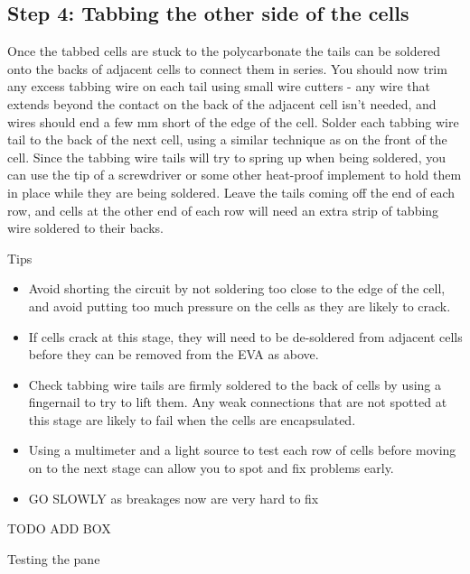\documentclass{article}
\theoremstyle{definition}
\theoremstyle{definition}
\theoremstyle{remark}
\begin{document}

  \subsection{Step 4: Tabbing the other side of the cells} %
  \label{sub:step_4_tabbing_the_other_side_of_the_cells}

    Once the tabbed cells are stuck to the polycarbonate the tails can be soldered onto the backs of adjacent cells to connect them in series. You should now trim any excess tabbing wire on each tail using small wire cutters - any wire that extends beyond the contact on the back of the adjacent cell isn’t needed, and wires should end a few mm short of the edge of the cell. Solder each tabbing wire tail to the back of the next cell, using a similar technique as on the front of the cell. Since the tabbing wire tails will try to spring up when being soldered, you can use the tip of a screwdriver or some other heat-proof implement to hold them in place while they are being soldered. Leave the tails coming off the end of each row, and cells at the other end of each row will need an extra strip of tabbing wire soldered to their backs.

    Tips

    \begin{itemize}
      \item Avoid shorting the circuit by not soldering too close to the edge of the cell, and avoid putting too much pressure on the cells as they are likely to crack. 
      \item If cells crack at this stage, they will need to be de-soldered from adjacent cells before they can be removed from the EVA as above.
      \item Check tabbing wire tails are firmly soldered to the back of cells by using a fingernail to try to lift them. Any weak connections that are not spotted at this stage are likely to fail when the cells are encapsulated.
      \item Using a multimeter and a light source to test each row of cells before moving on to the next stage can allow you to spot and fix problems early.
      \item GO SLOWLY as breakages now are very hard to fix
    \end{itemize}

    TODO ADD BOX

    Testing the pane
\end{document}
